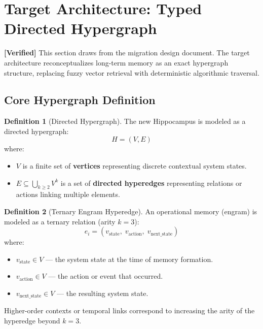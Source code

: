 \documentclass[11pt]{article}
\newcommand{\verified}{\textcolor{verifiedgreen}{\textbf{[Verified]}}}
\theoremstyle{definition}
\newtheorem{definition}{Definition}[section]
\theoremstyle{remark}
\begin{document}
\section{Target Architecture: Typed Directed Hypergraph}
\label{sec:target}

\verified{} This section draws from the migration design document. The target architecture reconceptualizes
long-term memory as an exact hypergraph structure, replacing fuzzy vector
retrieval with deterministic algorithmic traversal.

\subsection{Core Hypergraph Definition}

\begin{definition}[Directed Hypergraph]
\label{def:hypergraph}
The new Hippocampus is modeled as a directed hypergraph:
\[
  H = (V, E)
\]
where:
\begin{itemize}[nosep]
  \item $V$ is a finite set of \textbf{vertices} representing discrete
    contextual system states.
  \item $E \subseteq \bigcup_{k \geq 2} V^k$ is a set of \textbf{directed
    hyperedges} representing relations or actions linking multiple elements.
\end{itemize}
\end{definition}

\begin{definition}[Ternary Engram Hyperedge]
\label{def:ternary}
An operational memory (engram) is modeled as a ternary relation (arity $k = 3$):
\[
  e_i = (v_{\text{state}}, \; v_{\text{action}}, \; v_{\text{next\_state}})
\]
where:
\begin{itemize}[nosep]
  \item $v_{\text{state}} \in V$ --- the system state at the time of memory formation.
  \item $v_{\text{action}} \in V$ --- the action or event that occurred.
  \item $v_{\text{next\_state}} \in V$ --- the resulting system state.
\end{itemize}
Higher-order contexts or temporal links correspond to increasing the arity of
the hyperedge beyond $k = 3$.
\end{definition}
\end{document}
